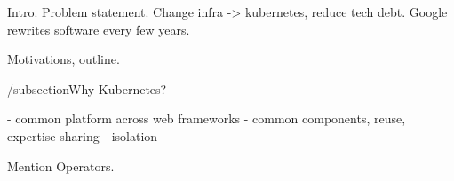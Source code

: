 Intro.
Problem statement. Change infra -> kubernetes, reduce tech debt.
Google rewrites software every few years.

Motivations, outline.

/subsection{Why Kubernetes?}

- common platform across web frameworks
- common components, reuse, expertise sharing
- isolation

Mention Operators.